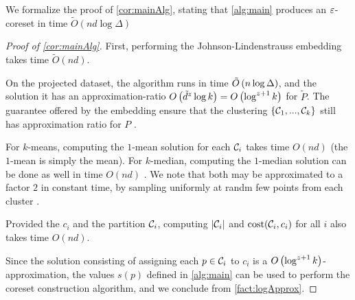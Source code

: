 We formalize the proof of \cref{cor:mainAlg}, stating that \cref{alg:main} produces an $\varepsilon$-coreset in time $\tilde O(nd \log \Delta)$
\begin{proof}[Proof of \cref{cor:mainAlg}]
First, performing the Johnson-Lindenstrauss embedding takes time $\tilde O(nd)$.

On the projected dataset, the algorithm \fkmeans runs in time $\tilde O\left( n \log \Delta\right)$, and the solution it has an approximation-ratio $O\left( \tilde{d}^z \log k\right) = O\left(\log^{z+1} k\right)$ for $\tilde P$. 
The guarantee offered by the embedding ensure that the clustering $\left\{ \mathcal C_1,...,\mathcal C_k\right\}$ still has approximation ratio for $P$ \cite{makarychev2019performance}. 

For $k$-means, computing the $1$-mean solution for each $\mathcal C_i$ takes time $O(nd)$ (the $1$-mean is simply the mean). 
For $k$-median, computing the $1$-median solution can be done as well in time $O(nd)$ \cite{CohenLMPS16}. 
We note that both may be approximated to a factor $2$ in constant time, by sampling uniformly at randm few points from each cluster \cite{neurips21}.

Provided the $c_i$ and the partition $\mathcal C_i$, computing $|\mathcal C_i|$ and $\operatorname{cost}(\mathcal C_i, c_i)$ for all $i$ also takes time $O(nd)$.

Since the solution consisting of assigning each $p \in \mathcal C_i$ to $c_i$ is a $O\left( \log^{z+1} k\right)$-approximation, the values $s(p)$ defined in \cref{alg:main} can be used to perform the coreset construction algorithm, and we conclude from \cref{fact:logApprox}.
\end{proof}


